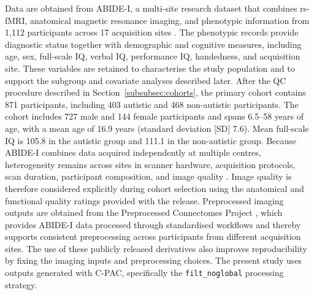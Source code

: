 Data are obtained from ABIDE-I, a multi-site research dataset that combines rs-fMRI, anatomical magnetic resonance imaging, and phenotypic information from 1,112 participants across 17 acquisition sites \citep{DiMartinoetal2014}. The phenotypic records provide diagnostic status together with demographic and cognitive measures, including age, sex, full-scale IQ, verbal IQ, performance IQ, handedness, and acquisition site. These variables are retained to characterise the study population and to support the subgroup and covariate analyses described later. After the QC procedure described in Section~\ref{subsubsec:cohorts}, the primary cohort contains 871 participants, including 403 autistic and 468 non-autistic participants. The cohort includes 727 male and 144 female participants and spans 6.5--58 years of age, with a mean age of 16.9 years (standard deviation [SD] 7.6). Mean full-scale IQ is 105.8 in the autistic group and 111.1 in the non-autistic group. Because ABIDE-I combines data acquired independently at multiple centres, heterogeneity remains across sites in scanner hardware, acquisition protocols, scan duration, participant composition, and image quality \citep{Abrahametal2017}. Image quality is therefore considered explicitly during cohort selection using the anatomical and functional quality ratings provided with the release. Preprocessed imaging outputs are obtained from the Preprocessed Connectomes Project \citep{Craddocketal2013}, which provides ABIDE-I data processed through standardised workflows and thereby supports consistent preprocessing across participants from different acquisition sites. The use of these publicly released derivatives also improves reproducibility by fixing the imaging inputs and preprocessing choices. The present study uses outputs generated with C-PAC, specifically the \texttt{filt\_noglobal} processing strategy.

